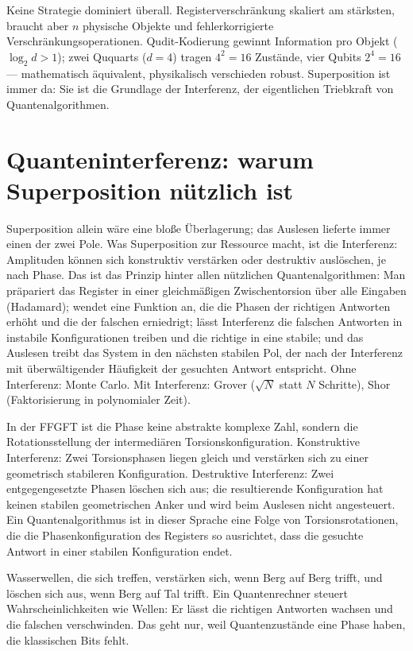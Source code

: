 Keine Strategie dominiert überall. Registerverschränkung skaliert am
stärksten, braucht aber $n$ physische Objekte und fehlerkorrigierte
Verschränkungsoperationen. Qudit-Kodierung gewinnt Information pro Objekt
($\log_2d>1$); zwei Ququarts ($d = 4$) tragen $4^2 = 16$ Zustände, vier
Qubits $2^4 = 16$ --- mathematisch äquivalent, physikalisch verschieden
robust. Superposition ist immer da: Sie ist die Grundlage der
Interferenz, der eigentlichen Triebkraft von Quantenalgorithmen.

\section{Quanteninterferenz: warum Superposition nützlich ist}

Superposition allein wäre eine bloße Überlagerung; das Auslesen lieferte
immer einen der zwei Pole. Was Superposition zur Ressource macht, ist die
Interferenz: Amplituden können sich konstruktiv verstärken oder
destruktiv auslöschen, je nach Phase. Das ist das Prinzip
hinter allen nützlichen Quantenalgorithmen: Man präpariert das Register
in einer gleichmäßigen Zwischentorsion über alle Eingaben (Hadamard);
wendet eine Funktion an, die die Phasen der richtigen Antworten erhöht
und die der falschen erniedrigt; lässt Interferenz die falschen
Antworten in instabile Konfigurationen treiben und die richtige in eine
stabile; und das Auslesen treibt das System in den nächsten stabilen
Pol, der nach der Interferenz mit überwältigender Häufigkeit der
gesuchten Antwort entspricht. Ohne Interferenz: Monte Carlo. Mit
Interferenz: Grover ($\sqrt N$ statt $N$ Schritte), Shor (Faktorisierung
in polynomialer Zeit).

In der FFGFT ist die Phase keine abstrakte komplexe Zahl, sondern die
Rotationsstellung der intermediären Torsionskonfiguration. Konstruktive
Interferenz: Zwei Torsionsphasen liegen gleich und verstärken sich zu
einer geometrisch stabileren Konfiguration. Destruktive Interferenz:
Zwei entgegengesetzte Phasen löschen sich aus; die resultierende
Konfiguration hat keinen stabilen geometrischen Anker und wird beim
Auslesen nicht angesteuert. Ein Quantenalgorithmus ist in dieser
Sprache eine Folge von Torsionsrotationen, die die Phasenkonfiguration
des Registers so ausrichtet, dass die gesuchte Antwort in einer stabilen
Konfiguration endet.

\begin{laierspur}
Wasserwellen, die sich treffen, verstärken sich, wenn Berg auf Berg
trifft, und löschen sich aus, wenn Berg auf Tal trifft. Ein
Quantenrechner steuert Wahrscheinlichkeiten wie Wellen: Er lässt die
richtigen Antworten wachsen und die falschen verschwinden. Das geht nur,
weil Quantenzustände eine Phase haben, die klassischen Bits fehlt.
\end{laierspur}

